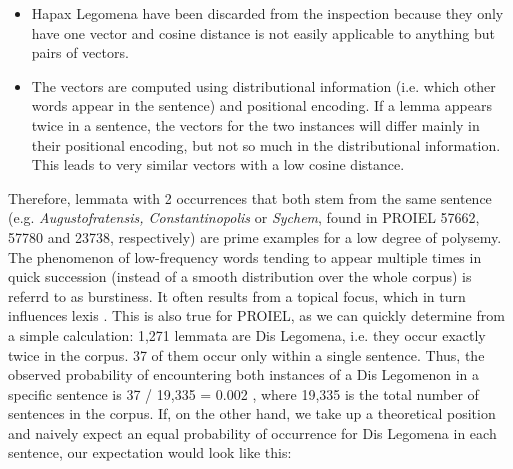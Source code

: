 \documentclass[runningheads]{llncs}
\begin{document}
\begin{itemize}
	\item Hapax Legomena have been discarded from the inspection because they only have one vector and cosine distance is not easily applicable to anything but pairs of vectors.
	\item The vectors are computed using distributional information (i.e. which other words appear in the sentence) and positional encoding. If a lemma appears twice in a sentence, the vectors for the two instances will differ mainly in their positional encoding, but not so much in the distributional information. This leads to very similar vectors with a low cosine distance.
\end{itemize}
Therefore, lemmata with 2 occurrences that both stem from the same sentence (e.g. \textit{Augustofratensis, Constantinopolis} or \textit{Sychem}, found in PROIEL 57662, 57780 and 23738, respectively) are prime examples for a low degree of polysemy. The phenomenon of low-frequency words tending to appear multiple times in quick succession (instead of a smooth distribution over the whole corpus) is referrd to as burstiness. It often results from a topical focus, which in turn influences lexis \parencite[99]{pierrehumbertBurstinessVerbsDerived2012}. This is also true for PROIEL, as we can quickly determine from a simple calculation: 1,271 lemmata are Dis Legomena, i.e. they occur exactly twice in the corpus. 37 of them occur only within a single sentence. Thus, the observed probability of encountering both instances of a Dis Legomenon in a specific sentence is 37 / 19,335 = 0.002 , where 19,335 is the total number of sentences in the corpus. If, on the other hand, we take up a theoretical position and naively expect an equal probability of occurrence for Dis Legomena in each sentence, our expectation would look like this:
\end{document}
